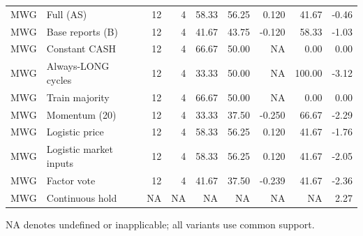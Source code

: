 \begin{table}[htbp]
\begin{tabular}{llrrrrrrr}
MWG & Full (AS) & 12 & 4 & 58.33 & 56.25 & 0.120 & 41.67 & -0.46 \\
MWG & Base reports (B) & 12 & 4 & 41.67 & 43.75 & -0.120 & 58.33 & -1.03 \\
MWG & Constant CASH & 12 & 4 & 66.67 & 50.00 & NA & 0.00 & 0.00 \\
MWG & Always-LONG cycles & 12 & 4 & 33.33 & 50.00 & NA & 100.00 & -3.12 \\
MWG & Train majority & 12 & 4 & 66.67 & 50.00 & NA & 0.00 & 0.00 \\
MWG & Momentum (20) & 12 & 4 & 33.33 & 37.50 & -0.250 & 66.67 & -2.29 \\
MWG & Logistic price & 12 & 4 & 58.33 & 56.25 & 0.120 & 41.67 & -1.76 \\
MWG & Logistic market inputs & 12 & 4 & 58.33 & 56.25 & 0.120 & 41.67 & -2.05 \\
MWG & Factor vote & 12 & 4 & 41.67 & 37.50 & -0.239 & 41.67 & -2.36 \\
MWG & Continuous hold & NA & NA & NA & NA & NA & NA & 2.27 \\
\hline
\end{tabular}
\par\smallskip\footnotesize NA denotes undefined or inapplicable; all variants use common support.
\end{table}

